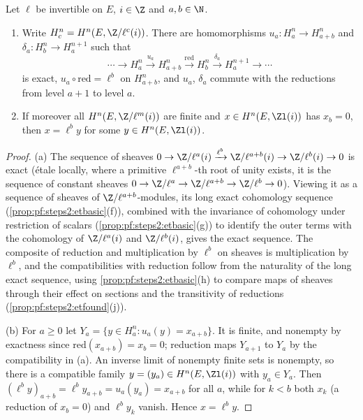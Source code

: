 \begin{lemma}\label{lem:pf:steps2:bock}
Let $\ell$ be invertible on $E$, $i\in\Z$ and $a,b\in\N$.
\begin{enumerate}[label=\textup{(\alph*)},nosep]
\item Write $H^n_c=H^n(E,\Z/\ell^c(i))$. There are homomorphisms $u_a\colon H^n_a\to H^n_{a+b}$ and
  $\delta_a\colon H^n_b\to H^{n+1}_a$ such that
  \[
    \cdots\to H^n_a\xrightarrow{u_a}H^n_{a+b}\xrightarrow{\mathrm{red}}H^n_b\xrightarrow{\delta_a}
    H^{n+1}_a\to\cdots
  \]
  is exact, $u_a\circ\mathrm{red}=\ell^b$ on $H^n_{a+b}$, and $u_a$, $\delta_a$ commute
  with the reductions from level $a+1$ to level $a$.
\item If moreover all $H^n(E,\Z/\ell^m(i))$ are finite and $x\in H^n(E,\Zl(i))$ has $x_b=0$, then
  $x=\ell^by$ for some $y\in H^n(E,\Zl(i))$.
\end{enumerate}
\end{lemma}

\begin{proof}
(a) The sequence of sheaves $0\to\Z/\ell^a(i)\xrightarrow{\ell^b}\Z/\ell^{a+b}(i)\to\Z/\ell^b(i)\to0$
is exact (\'etale locally, where a primitive $\ell^{a+b}$-th root of unity exists, it is the sequence
of constant sheaves $0\to\Z/\ell^a\to\Z/\ell^{a+b}\to\Z/\ell^b\to0$). Viewing it as a sequence of
sheaves of $\Z/\ell^{a+b}$-modules, its long exact cohomology sequence
(\cref{prop:pf:steps2:etbasic}(f)), combined with the invariance of cohomology under restriction of
scalars (\cref{prop:pf:steps2:etbasic}(g)) to identify the outer terms with the cohomology of
$\Z/\ell^a(i)$ and $\Z/\ell^b(i)$, gives the exact sequence. The composite of reduction and
multiplication by $\ell^b$ on sheaves is multiplication by $\ell^b$, and the compatibilities with
reduction follow from the naturality of the long exact sequence, using
\cref{prop:pf:steps2:etbasic}(h) to compare maps of sheaves through their effect on sections and the
transitivity of reductions (\cref{prop:pf:steps2:etfound}(j)).

(b) For $a\ge0$ let $Y_a=\{y\in H^n_a:u_a(y)=x_{a+b}\}$. It is finite, and nonempty by
exactness since $\mathrm{red}(x_{a+b})=x_b=0$; reduction maps $Y_{a+1}$ to $Y_a$ by the compatibility in
(a). An inverse limit of nonempty finite sets is nonempty, so there is a compatible family
$y=(y_a)\in H^n(E,\Zl(i))$ with $y_a\in Y_a$. Then $(\ell^by)_{a+b}=\ell^by_{a+b}=u_a(y_a)=x_{a+b}$ for
all $a$, while for $k<b$ both $x_k$ (a reduction of $x_b=0$) and $\ell^by_k$ vanish. Hence $x=\ell^by$.
\end{proof}

